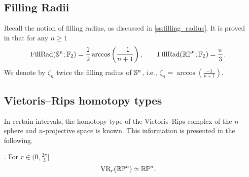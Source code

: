 \subsection{Filling Radii}

Recall the notion of filling radius, as discussed in \cref{ss:filling_radius}.
It is proved in \cite{katz1983filling} that for any $n \geq 1$
\[
\operatorname{FillRad}(\mathbb{S}^n;{\mathbb{F}_2}) = \frac{1}{2}\arccos\left(\frac{-1}{n+1}\right), \qquad
\operatorname{FillRad}(\mathbb{RP}^n;{\mathbb{F}_2}) = \frac{\pi}{3}.
\]
We denote by $\zeta_n$ twice the filling radius of $\mathbb{S}^n$, i.e., $\zeta_n = \arccos(\frac{-1}{n+1})$.

\subsection{Vietoris--Rips homotopy types}\label{prop:homotopy type}

In certain intervals, the homotopy type of the Vietoris--Rips complex of the $n$-sphere and $n$-projective space is known.
This information is presented in the following.

\label{prop:RPn}{\rm \cite[Thm.~4.5]{adams2022metric}.}
For $r \in (0,\frac{2\pi}{3} ]$
\[
\operatorname{VR}_r(\mathbb{RP}^n) \simeq \mathbb{RP}^n.
\]